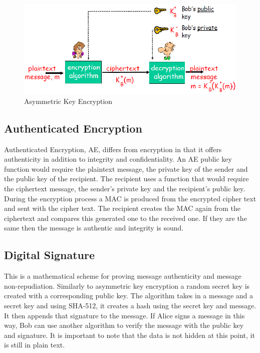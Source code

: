\begin{figure}[H]
	\centering
	\includegraphics[width=1\linewidth]{Figures/publickeyex.png}
	\caption{Asymmetric Key Encryption}
	\label{fig:asy}
\end{figure}

\subsection{Authenticated Encryption}

Authenticated Encryption, AE, differs from encryption in that it offers authenticity in addition to integrity and confidentiality. An AE public key function would require the plaintext message, the private key of the sender and the public key of the recipient. The recipient uses a function that would require the ciphertext message, the sender's private key and the recipient's public key. During the encryption process a MAC is produced from the encrypted cipher text and sent with the cipher text. The recipient creates the MAC again from the ciphertext and compares this generated one to the received one. If they are the same then the message is authentic and integrity is sound. 
\subsection{Digital Signature}

This is a mathematical scheme for proving message authenticity and message non-repudiation. Similarly to asymmetric key encryption a random secret key is created with a corresponding public key. The algorithm takes in a message and a secret key and using SHA-512, it creates a hash using the secret key and message. It then appends that signature to the message. If Alice signs a message in this way, Bob can use another algorithm to verify the message with the public key and signature. It is important to note that the data is not hidden at this point, it is still in plain text.

